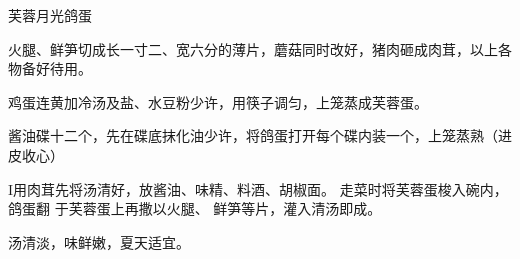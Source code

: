 \begin{recipe}{芙蓉月光鸽蛋}

\ingredients


\preparation

\step 火腿、鲜笋切成长一寸二、宽六分的薄片，蘑菇同时改好，猪肉砸成肉茸，以上各
物备好待用。

\step 鸡蛋连黄加冷汤及盐、水豆粉少许，用筷子调匀，上笼蒸成芙蓉蛋。

\step 酱油碟十二个，先在碟底抹化油少许，将鸽蛋打开每个碟内装一个，上笼蒸熟（进
皮收心）

I用肉茸先将汤清好，放酱油、味精、料酒、胡椒面。 走菜时将芙蓉蛋梭入碗内，鸽蛋翻
于芙蓉蛋上再撒以火腿、 鲜笋等片，灌入清汤即成。

\features

汤清淡，味鲜嫩，夏天适宜。

\end{recipe}

